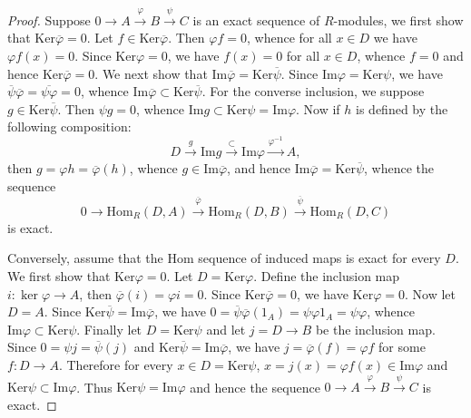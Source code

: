 \begin{proof}
Suppose $0\longrightarrow A\overset{\varphi}{\longrightarrow}B\overset{\psi}{\longrightarrow}C$ is an exact sequence of $R$-modules, we first show that $\mathrm{Ker}\overline{\varphi}=0$. Let $f\in\mathrm{Ker}\overline{\varphi}$. Then $\varphi f=0$, whence for all $x\in D$ we have $\varphi f(x)=0$. Since $\mathrm{Ker}\varphi=0$, we have $f(x)=0$ for all $x\in D$, whence $f=0$ and hence $\mathrm{Ker}\overline{\varphi}=0$. We next show that $\mathrm{Im}\overline{\varphi}=\mathrm{Ker}\overline{\psi}$. Since $\mathrm{Im}\varphi=\mathrm{Ker}\psi$, we have $\overline{\psi}\overline{\varphi}=\overline{\psi\varphi}=0$, whence $\mathrm{Im}\overline{\varphi}\subset\mathrm{Ker}\overline{\psi}$. For the converse inclusion, we suppose $g\in\mathrm{Ker}\overline{\psi}$. Then $\psi g=0$, whence $\mathrm{Im}g\subset\mathrm{Ker}\psi=\mathrm{Im}\varphi$. Now if $h$ is defined by the following composition: 
$$
D\overset{g}{\longrightarrow}\mathrm{Im}g\overset{\subset}{\longrightarrow}\mathrm{Im}\varphi \overset{\varphi ^{-1}}{\longrightarrow}A,
$$
then $g=\varphi h=\overline{\varphi }\left( h \right) $, whence $g\in\mathrm{Im}\overline{\varphi}$, and hence $\mathrm{Im}\overline{\varphi}=\mathrm{Ker}\overline{\psi}$, whence the sequence 
$$
0\longrightarrow \mathrm{Hom}_R\left( D,A \right) \overset{\overline{\varphi }}{\longrightarrow}\mathrm{Hom}_R\left( D,B \right) \overset{\overline{\psi }}{\longrightarrow}\mathrm{Hom}_R\left( D,C \right) 
$$
is exact.\par
Conversely, assume that the $\mathrm{Hom}$ sequence of induced maps is exact for every $D$. We first show that $\mathrm{Ker}\varphi=0$. Let $D=\mathrm{Ker}\varphi$. Define the inclusion map $i:\ker\varphi\to A$, then $\overline{\varphi}(i)=\varphi i=0$. Since $\mathrm{Ker}\overline{\varphi}=0$, we have $\mathrm{Ker}\varphi=0$. Now let $D=A$. Since $\mathrm{Ker}\overline{\psi}=\mathrm{Im}\overline{\varphi}$, we have $0=\overline{\psi }\overline{\varphi }\left( 1_A \right) =\psi \varphi 1_A=\psi \varphi $, whence $\mathrm{Im}\varphi\subset\mathrm{Ker}\psi$. Finally let $D=\mathrm{Ker}\psi$ and let $j=D\to B$ be the inclusion map. Since $0=\psi j=\overline{\psi}(j)$ and $\mathrm{Ker}\overline{\psi}=\mathrm{Im}\overline{\varphi}$, we have $j=\overline{\varphi}(f)=\varphi f$ for some $f:D\to A$. Therefore for every $x\in D=\mathrm{Ker}\psi$, $x=j(x)=\varphi f(x)\in\mathrm{Im}\varphi$ and $\mathrm{Ker}\psi\subset\mathrm{Im}\varphi$. Thus $\mathrm{Ker}\psi=\mathrm{Im}\varphi$ and hence the sequence $0\longrightarrow A\overset{\varphi}{\longrightarrow}B\overset{\psi}{\longrightarrow}C$ is exact.
\end{proof}

